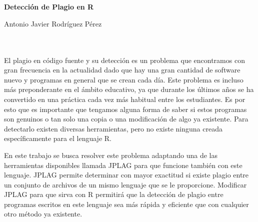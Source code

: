 \chapter*{}

\thispagestyle{empty}





\cleardoublepage
\thispagestyle{empty}

\begin{center}
{\large\bfseries Detección de Plagio en R}\\
\end{center}
\begin{center}
Antonio Javier Rodríguez Pérez\\
\end{center}

\\

\vspace{0.7cm}
\\

El plagio en código fuente y su detección es un problema que encontramos con gran frecuencia en la actualidad dado que hay una gran cantidad de software nuevo y programas en general que se crean cada día.
\newline
Este problema es incluso más preponderante en el ámbito educativo, ya que durante los últimos años se ha convertido en una práctica cada vez más habitual entre los estudiantes.
\newline
Es por esto que es importante que tengamos alguna forma de saber si estos programas son genuinos o tan solo una copia o una modificación de algo ya existente.
\newline
Para detectarlo existen diversas herramientas, pero no existe ninguna creada específicamente para el lenguaje R. 

\vspace{0.3cm}

En este trabajo se busca resolver este problema adaptando una de las herramientas disponibles llamada JPLAG para que funcione también con este lenguaje.
\newline
JPLAG permite determinar con mayor exactitud si existe plagio entre un conjunto de archivos de un mismo lenguaje que se le proporcione.
\newline
Modificar JPLAG para que sirva con R permitirá que la detección de plagio entre programas escritos en este lenguaje sea más rápida y eficiente que con cualquier otro método ya existente.

